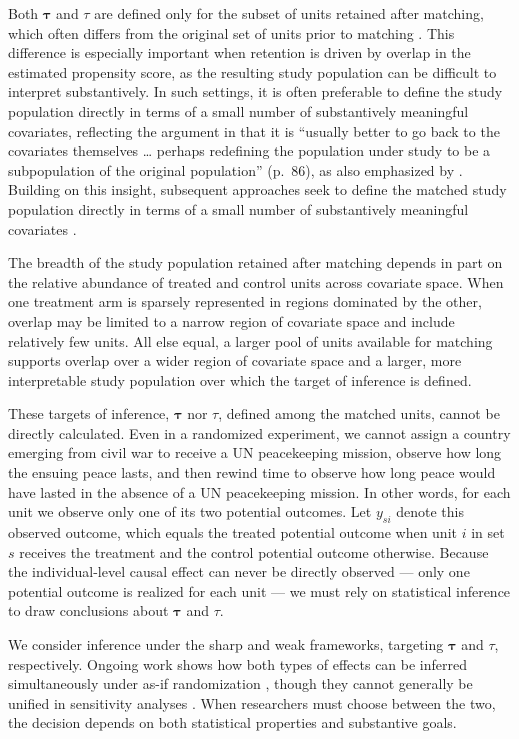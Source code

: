 \documentclass[
  12pt,
  leqno]{article}
\begin{document}
Both \(\bm{\tau}\) and \(\tau\) are defined only for the subset of units
retained after matching, which often differs from the original set of
units prior to matching \citep{rosenbaumrubin1985, rosenbaum2012}. This
difference is especially important when retention is driven by overlap
in the estimated propensity score, as the resulting study population can
be difficult to interpret substantively. In such settings, it is often
preferable to define the study population directly in terms of a small
number of substantively meaningful covariates, reflecting the argument
in \citet{rosenbaum2010} that it is ``usually better to go back to the
covariates themselves \ldots{} perhaps redefining the population under
study to be a subpopulation of the original population'' (p.~86), as
also emphasized by \citet{stuart2010}. Building on this insight,
subsequent approaches seek to define the matched study population
directly in terms of a small number of substantively meaningful
covariates \citep{fogartyetal2016, traskinsmall2011}.

The breadth of the study population retained after matching depends in
part on the relative abundance of treated and control units across
covariate space. When one treatment arm is sparsely represented in
regions dominated by the other, overlap may be limited to a narrow
region of covariate space and include relatively few units. All else
equal, a larger pool of units available for matching supports overlap
over a wider region of covariate space and a larger, more interpretable
study population over which the target of inference is defined.

These targets of inference, \(\bm{\tau}\) nor \(\tau\), defined among
the matched units, cannot be directly calculated. Even in a randomized
experiment, we cannot assign a country emerging from civil war to
receive a UN peacekeeping mission, observe how long the ensuing peace
lasts, and then rewind time to observe how long peace would have lasted
in the absence of a UN peacekeeping mission. In other words, for each
unit we observe only one of its two potential outcomes. Let \(y_{si}\)
denote this observed outcome, which equals the treated potential outcome
when unit \(i\) in set \(s\) receives the treatment and the control
potential outcome otherwise. Because the individual-level causal effect
can never be directly observed --- only one potential outcome is
realized for each unit --- we must rely on statistical inference to draw
conclusions about \(\bm{\tau}\) and \(\tau\).

We consider inference under the sharp and weak frameworks, targeting
\(\bm{\tau}\) and \(\tau\), respectively. Ongoing work shows how both
types of effects can be inferred simultaneously under as-if
randomization
\citep{chungromano2013, ding2017, wuding2021, cohenfogarty2022}, though
they cannot generally be unified in sensitivity analyses
\citep{fogarty2023}. When researchers must choose between the two, the
decision depends on both statistical properties and substantive goals.
\end{document}
